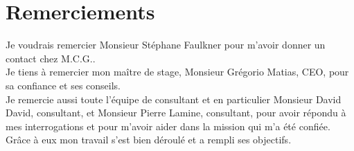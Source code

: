 \section*{Remerciements}
\thispagestyle{empty}
Je voudrais remercier Monsieur Stéphane Faulkner pour m'avoir donner un contact chez M.C.G..\\

Je tiens à remercier mon maître de stage, Monsieur Grégorio Matias, CEO, pour sa confiance et ses conseils. \\


Je remercie aussi toute l'équipe de consultant et en particulier Monsieur David David, consultant, et Monsieur Pierre Lamine, consultant, pour avoir répondu à mes interrogations et pour m'avoir aider dans la mission qui m'a été confiée. Grâce à eux mon travail s'est bien déroulé et a rempli ses objectifs.

\clearpage